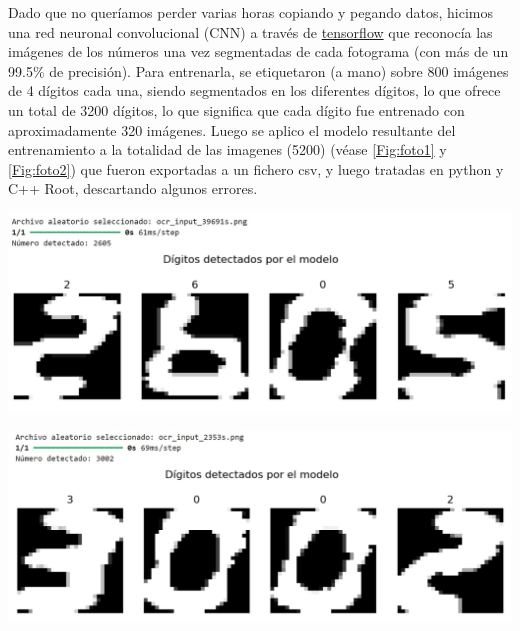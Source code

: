 \documentclass[11pt]{article}
\begin{document}
\vspace{1em}

 Dado que no queríamos perder varias horas copiando y pegando datos, hicimos una red neuronal convolucional (CNN) a través de \href{https://www.tensorflow.org/}{tensorflow} \cite{tensorflow2015-whitepaper} que reconocía las imágenes de los números una vez segmentadas de cada fotograma (con más de un 99.5\% de precisión). Para entrenarla, se etiquetaron (a mano) sobre 800 imágenes de 4 dígitos cada una, siendo segmentados en los diferentes dígitos, lo que ofrece un total de 3200 dígitos, lo que significa que cada dígito fue entrenado con aproximadamente 320 imágenes. Luego se aplico el modelo resultante del entrenamiento a la totalidad de las imagenes (5200) (véase \cref{Fig:foto1} y \ref{Fig:foto2}) que fueron exportadas a un fichero csv, y luego tratadas en python y C++ Root, descartando algunos errores.

\begin{minipage}[t]{0.45\linewidth}
	\begin{center}
	\label{Fig:foto1}
	\includegraphics[width=0.9\linewidth]{../Imagenes/Foto1.jpeg}
	\end{center}
\end{minipage}	
\hfill
\begin{minipage}[t]{0.45\linewidth}
\begin{center}
	\label{Fig:foto2}
	\includegraphics[width=0.9\linewidth]{../Imagenes/Foto2.jpeg}
\end{center}
\end{minipage}	
\end{document}
